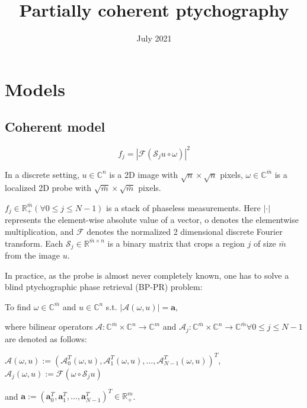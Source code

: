 \documentclass{article}
\title{ Partially coherent ptychography}
\date{July 2021}
\numberwithin{equation}{section}
\begin{document}
\maketitle
\tableofcontents

\section{Models}



\subsection{Coherent model}
\begin{equation}
\label{basic}
f_{j}=\left|\mathcal{F}\left( \mathcal{S}_{j} u  \circ \omega \right)\right|^{2} 
\end{equation}

In a discrete setting, $u \in \mathbb{C}^{n}$ is a 2D image with $\sqrt{n} \times \sqrt{n}$ pixels, $\omega \in \mathbb{C}^{\bar{m}}$ is a localized 2D probe with $\sqrt{\bar{m}} \times \sqrt{\bar{m}}$ pixels.

$f_{j} \in \mathbb{R}_{+}^{\bar{m}}(\forall 0 \leq j \leq N-1)$ is a stack of phaseless measurements. Here $|\cdot|$ represents the element-wise absolute value of a vector, o denotes the elementwise multiplication, and $\mathcal{F}$ denotes the normalized 2 dimensional discrete Fourier transform. Each $\mathcal{S}_{j} \in \mathbb{R}^{\bar{m} \times n}$ is a binary matrix that crops a region $j$ of size $\bar{m}$ from the image $u$.

In practice, as the probe is almost never completely known, one has to solve a blind ptychographic phase retrieval (BP-PR) problem:

 To find $\omega \in \mathbb{C}^{\bar{m}}$ and $u \in \mathbb{C}^{n}$ s.t. $|\mathcal{A}(\omega, u)|=\boldsymbol{a}$,
 
where bilinear operators $\mathcal{A}: \mathbb{C}^{\bar{m}} \times \mathbb{C}^{n} \rightarrow \mathbb{C}^{m}$ and $\mathcal{A}_{j}: \mathbb{C}^{\bar{m}} \times \mathbb{C}^{n} \rightarrow \mathbb{C}^{\bar{m}} \forall 0 \leq j \leq N-1$ are
denoted as follows:

 $\mathcal{A}(\omega, u):=\left(\mathcal{A}_{0}^{T}(\omega, u), \mathcal{A}_{1}^{T}(\omega, u), \ldots, \mathcal{A}_{N-1}^{T}(\omega, u)\right)^{T}$, $\mathcal{A}_{j}(\omega, u):=\mathcal{F}\left(\omega \circ \mathcal{S}_{j} u\right)$
 
and $\boldsymbol{a}:=\left(\boldsymbol{a}_{0}^{T}, \boldsymbol{a}_{1}^{T}, \ldots, \boldsymbol{a}_{N-1}^{T}\right)^{T} \in \mathbb{R}_{+}^{m}$.
\end{document}
